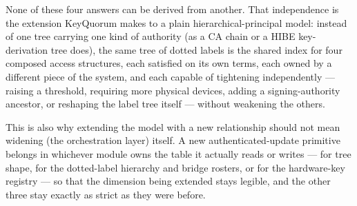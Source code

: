 None of these four answers can be derived from another. That independence
is the extension KeyQuorum makes to a plain hierarchical-principal model:
instead of one tree carrying one kind of authority (as a CA chain or a HIBE
key-derivation tree does), the same tree of dotted labels is the shared
index for four composed access structures, each satisfied on its own
terms, each owned by a different piece of the system, and each capable of
tightening independently --- raising a threshold, requiring more physical
devices, adding a signing-authority ancestor, or reshaping the label tree
itself --- without weakening the others.

\begin{noteBox}
This is also why extending the model with a new relationship should not
mean widening  (the orchestration layer) itself. A new
authenticated-update primitive belongs in whichever module owns the table
it actually reads or writes ---  for tree shape,
 for the dotted-label hierarchy and bridge
rosters, or  for the hardware-key registry --- so that the
dimension being extended stays legible, and the other three stay exactly
as strict as they were before.
\end{noteBox}
